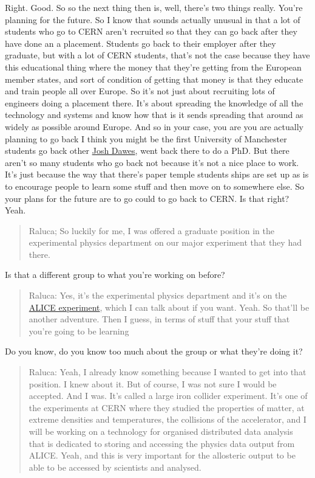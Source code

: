 \documentclass[
]{book}
\begin{document}
Right. Good. So so the next thing then is, well, there's two things really. You're planning for the future. So I know that sounds actually unusual in that a lot of students who go to CERN aren't recruited so that they can go back after they have done an a placement. Students go back to their employer after they graduate, but with a lot of CERN students, that's not the case because they have this educational thing where the money that they're getting from the European member states, and sort of condition of getting that money is that they educate and train people all over Europe. So it's not just about recruiting lots of engineers doing a placement there. It's about spreading the knowledge of all the technology and systems and know how that is it sends spreading that around as widely as possible around Europe. And so in your case, you are you are actually planning to go back I think you might be the first University of Manchester students go back other \href{https://joshhdawes.github.io/}{Josh Dawes}, went back there to do a PhD. But there aren't so many students who go back not because it's not a nice place to work. It's just because the way that there's paper temple students ships are set up as is to encourage people to learn some stuff and then move on to somewhere else. So your plans for the future are to go could to go back to CERN. Is that right? Yeah.

\begin{quote}
Raluca; So luckily for me, I was offered a graduate position in the experimental physics department on our major experiment that they had there.
\end{quote}

Is that a different group to what you're working on before?

\begin{quote}
Raluca: Yes, it's the experimental physics department and it's on the \href{https://en.wikipedia.org/wiki/ALICE_experiment}{ALICE experiment}, which I can talk about if you want. Yeah. So that'll be another adventure. Then I guess, in terms of stuff that your stuff that you're going to be learning
\end{quote}

Do you know, do you know too much about the group or what they're doing it?

\begin{quote}
Raluca: Yeah, I already know something because I wanted to get into that position. I knew about it. But of course, I was not sure I would be accepted. And I was. It's called a large iron collider experiment. It's one of the experiments at CERN where they studied the properties of matter, at extreme densities and temperatures, the collisions of the accelerator, and I will be working on a technology for organised distributed data analysis that is dedicated to storing and accessing the physics data output from ALICE. Yeah, and this is very important for the allosteric output to be able to be accessed by scientists and analysed.
\end{quote}
\end{document}
